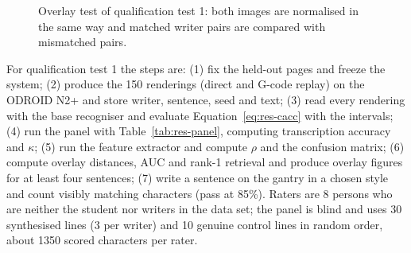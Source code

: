 \begin{figure}[h]
\centering
{}
\caption{Overlay test of qualification test 1: both images are normalised in the same way and matched writer pairs are compared with mismatched pairs.}
\label{fig:res-overlay}
\end{figure}

For qualification test 1 the steps are: (1) fix the held-out pages and freeze the system; (2) produce the 150 renderings (direct and G-code replay) on the ODROID N2+ and store writer, sentence, seed and text; (3) read every rendering with the base recogniser and evaluate Equation~\ref{eq:res-cacc} with the intervals; (4) run the panel with Table~\ref{tab:res-panel}, computing transcription accuracy and $\kappa$; (5) run the feature extractor and compute $\rho$ and the confusion matrix; (6) compute overlay distances, AUC and rank-1 retrieval and produce overlay figures for at least four sentences; (7) write a sentence on the gantry in a chosen style and count visibly matching characters (pass at 85\%).
Raters are 8 persons who are neither the student nor writers in the data set; the panel is blind and uses 30 synthesised lines (3 per writer) and 10 genuine control lines in random order, about 1350 scored characters per rater.


